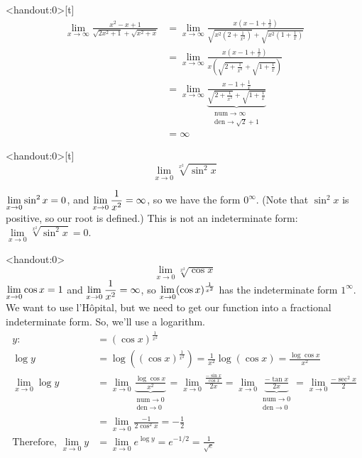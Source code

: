 \begin{frame}<handout:0>[t]
\color{answercolor}
\begin{align*}
\lim_{x \to \infty}
\frac{x^2-x+1}{\sqrt{2x^2+1}+\sqrt{x^2+x}}&=\lim_{x \to \infty}
\frac{x\left(x-1+\frac{1}{x}\right)}{\sqrt{x^2(2+\frac{1}{x^2})}+\sqrt{x^2(1+\frac{1}{x})}}\\
&=\lim_{x \to \infty}
\frac{x\left(x-1+\frac{1}{x}\right)}{x\left(\sqrt{2+\frac{1}{x^2}}+\sqrt{1+\frac{1}{x}}\right)}\\
&=\lim_{x \to \infty}
\underbrace{\frac{x-1+\frac{1}{x}}{\sqrt{2+\frac{1}{x^2}}+\sqrt{1+\frac{1}{x}}}}_{\substack
	{\mathrm{num}\to \infty\\
	 \mathrm{den}\to \sqrt{2}+1}}\\
&=\infty
\end{align*}
\color{answercolor}

\end{frame}
\begin{frame}<handout:0>[t]
\[\lim_{x \to 0}\sqrt[x^2]{\sin^2x}\]\pause


\color{answercolor}
 $\displaystyle\lim_{x \to 0} \sin^2 x = 0$, and $\displaystyle\lim_{x \to 0}\frac{1}{x^2}=\infty$, so we have the form $0^\infty$. (Note that $\sin^2 x$ is positive, so our root is defined.) This is not an indeterminate form: $\lim\limits_{x \to 0}\sqrt[x^2]{\sin^2 x}=0$.
\end{frame}
\begin{frame}<handout:0>
\[\lim_{x \to 0}\sqrt[x^2]{\cos x}\]\pause
\color{answercolor}
 $\displaystyle\lim_{x \to 0} \cos x =1$ and $\displaystyle\lim_{x \to 0}\frac{1}{x^2}=\infty$, so $\displaystyle\lim_{x \to 0}(\cos x)^{\frac{1}{x^2}}$ has the indeterminate form $1^\infty$. We want to use l'H\^opital, but we need to get our function into a fractional indeterminate form. So, we'll use a logarithm.
\begin{align*}
y:&=(\cos x)^{\frac{1}{x^2}}\\
\log y &= \log \left((\cos x)^{\frac{1}{x^2}}\right)
=\frac{1}{x^2}\log(\cos x)=\frac{\log \cos x}{x^2}\\
\lim_{x \to 0}\log y &=\lim_{x \to 0}\underbrace{\frac{\log \cos x}{x^2}}_{\substack
	{\mathrm{num}\to0\\
	 \mathrm{den}\to 0}}
	=
	\lim_{x \to 0} \frac{\frac{-\sin x}{\cos x}}{2x}=
	\lim_{x \to 0} \underbrace{\frac{-\tan x}{2x}}_{\substack
	{\mathrm{num}\to0\\
	 \mathrm{den}\to 0}}
	=
	\lim_{x \to 0}\frac{-\sec^2x}{2}\\
	&=\lim_{x \to 0}\frac{-1}{2\cos^2 x}=-\frac{1}{2}\\
\mbox{Therefore, } \lim_{x \to 0} y &=\lim_{x \to 0}e^{\log y}=e^{-1/2}=\frac{1}{\sqrt{e}}
\end{align*}
\color{answercolor}

\end{frame}
